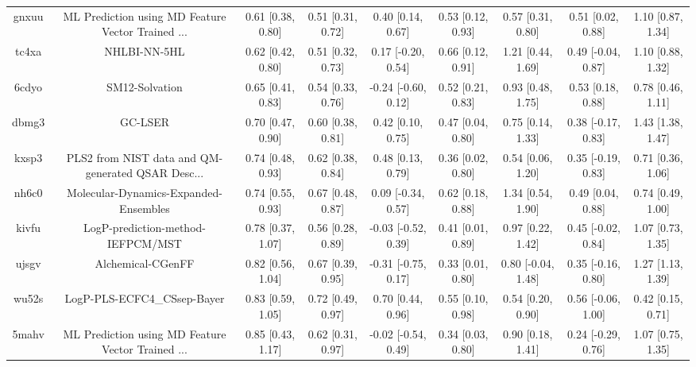 \documentclass{article}
\begin{document}
\begin{center}
\begin{longtable}{|ccccccccc|}
 gnxuu &  ML Prediction using MD Feature Vector Trained ... &  0.61 [0.38, 0.80] &  0.51 [0.31, 0.72] &     0.40 [0.14, 0.67] &  0.53 [0.12, 0.93] &    0.57 [0.31, 0.80] &    0.51 [0.02, 0.88] &     1.10 [0.87, 1.34] \\
 tc4xa &                                       NHLBI-NN-5HL &  0.62 [0.42, 0.80] &  0.51 [0.32, 0.73] &    0.17 [-0.20, 0.54] &  0.66 [0.12, 0.91] &    1.21 [0.44, 1.69] &   0.49 [-0.04, 0.87] &     1.10 [0.88, 1.32] \\
 6cdyo &                                     SM12-Solvation &  0.65 [0.41, 0.83] &  0.54 [0.33, 0.76] &   -0.24 [-0.60, 0.12] &  0.52 [0.21, 0.83] &    0.93 [0.48, 1.75] &    0.53 [0.18, 0.88] &     0.78 [0.46, 1.11] \\
 dbmg3 &                                            GC-LSER &  0.70 [0.47, 0.90] &  0.60 [0.38, 0.81] &     0.42 [0.10, 0.75] &  0.47 [0.04, 0.80] &    0.75 [0.14, 1.33] &   0.38 [-0.17, 0.83] &     1.43 [1.38, 1.47] \\
 kxsp3 &  PLS2 from NIST data and QM-generated QSAR Desc... &  0.74 [0.48, 0.93] &  0.62 [0.38, 0.84] &     0.48 [0.13, 0.79] &  0.36 [0.02, 0.80] &    0.54 [0.06, 1.20] &   0.35 [-0.19, 0.83] &     0.71 [0.36, 1.06] \\
 nh6c0 &              Molecular-Dynamics-Expanded-Ensembles &  0.74 [0.55, 0.93] &  0.67 [0.48, 0.87] &    0.09 [-0.34, 0.57] &  0.62 [0.18, 0.88] &    1.34 [0.54, 1.90] &    0.49 [0.04, 0.88] &     0.74 [0.49, 1.00] \\
 kivfu &                  LogP-prediction-method-IEFPCM/MST &  0.78 [0.37, 1.07] &  0.56 [0.28, 0.89] &   -0.03 [-0.52, 0.39] &  0.41 [0.01, 0.89] &    0.97 [0.22, 1.42] &   0.45 [-0.02, 0.84] &     1.07 [0.73, 1.35] \\
 ujsgv &                                  Alchemical-CGenFF &  0.82 [0.56, 1.04] &  0.67 [0.39, 0.95] &   -0.31 [-0.75, 0.17] &  0.33 [0.01, 0.80] &   0.80 [-0.04, 1.48] &   0.35 [-0.16, 0.80] &     1.27 [1.13, 1.39] \\
 wu52s &                        LogP-PLS-ECFC4\_CSsep-Bayer &  0.83 [0.59, 1.05] &  0.72 [0.49, 0.97] &     0.70 [0.44, 0.96] &  0.55 [0.10, 0.98] &    0.54 [0.20, 0.90] &   0.56 [-0.06, 1.00] &     0.42 [0.15, 0.71] \\
 5mahv &  ML Prediction using MD Feature Vector Trained ... &  0.85 [0.43, 1.17] &  0.62 [0.31, 0.97] &   -0.02 [-0.54, 0.49] &  0.34 [0.03, 0.80] &    0.90 [0.18, 1.41] &   0.24 [-0.29, 0.76] &     1.07 [0.75, 1.35] \\

\end{longtable}
\end{center}
\end{document}
